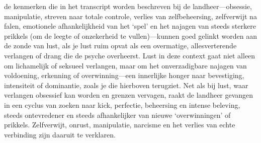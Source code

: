 de kenmerken die in het transcript worden beschreven bij de landheer—obsessie, manipulatie, streven naar totale controle, verlies van zelfbeheersing, zelfverwijt na falen, emotionele afhankelijkheid van het ‘spel’ en het najagen van steeds sterkere prikkels (om de leegte of onzekerheid te vullen)—kunnen goed gelinkt worden aan de zonde van lust, als je lust ruim opvat als een overmatige, allesverterende verlangen of drang die de psyche overheerst.
Lust in deze context gaat niet alleen om lichamelijk of seksueel verlangen, maar om het onverzadigbare najagen van voldoening, erkenning of overwinning—een innerlijke honger naar bevestiging, intensiteit of dominantie, zoals je die hierboven terugziet. Net als bij lust, waar verlangen obsessief kan worden en grenzen vervagen, raakt de landheer gevangen in een cyclus van zoeken naar kick, perfectie, beheersing en intense beleving, steeds ontevredener en steeds afhankelijker van nieuwe ‘overwinningen’ of prikkels. Zelfverwijt, onrust, manipulatie, narcisme en het verlies van echte verbinding zijn daaruit te verklaren.
